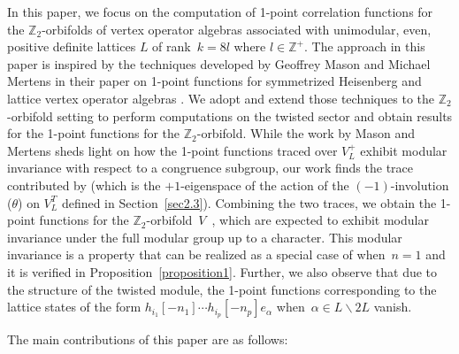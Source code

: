 \documentclass[pdftex]{sigma}
\numberwithin{equation}{section}
\theoremstyle{definition}
\begin{document}
In this paper, we focus on the computation of 1-point correlation functions for the \( \mathbb{Z}_2 \)-orbifolds of vertex operator algebras associated with unimodular, even, positive definite lattices $L$ of rank~${k=8l}$ where $l\in \mathbb{Z}^+$. The approach in this paper is inspired by the techniques developed by Geoffrey Mason and Michael Mertens in their paper on 1-point functions for symmetrized Heisenberg and lattice vertex operator algebras \cite{Mason20231-PointAlgebras}. We adopt and extend those techniques to the \( \mathbb{Z}_2 \)-orbifold setting to perform computations on the twisted sector and obtain results for the 1-point functions for the $\mathbb{Z}_2$-orbifold. While the work by Mason and Mertens sheds light on how the 1-point functions traced over $V_L^+$ exhibit modular invariance with respect to a congruence subgroup, our work finds the trace contributed by  (which is the $+1$-eigenspace of the action of the $(-1)$-involution ($\theta$) on $V_L^T$ defined in Section~\ref{sec2.3}). Combining the two traces, we obtain the 1-point functions for the $\mathbb{Z}_2$-orbifold~$V$~\cite{van2020Construction}, which are expected to exhibit modular invariance under the full modular group up to a character. This modular invariance is a property that can be realized as a special case of \cite[Theorem 5.1.1]{Zhu1996ModularAlgebras} when~${n=1}$ and it is verified in Proposition~\ref{proposition1}. Further, we also observe that due to the structure of the twisted module, the 1-point functions corresponding to the lattice states of the form $h_{i_1}[-n_1]\cdots h_{i_p}[-n_p]e_{\alpha}$ when~${\alpha\in L\backslash 2L}$ vanish.

The main contributions of this paper are as follows:
\end{document}
